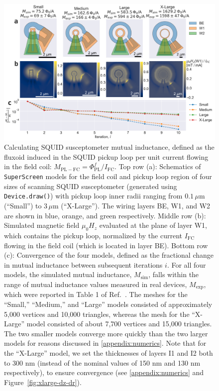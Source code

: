 \documentclass[final,3p,times,twocolumn]{elsarticle}
\newcommand{\inline}[1]{\texttt{#1}\xspace}
\newcommand{\SuperScreen}{\inline{SuperScreen}}
\newcommand{\um}{\mu\mathrm{m}}
\begin{document}
\begin{figure}[t]
    \centering
    \includegraphics[width=\textwidth]{examples/images/squid-mutuals.pdf}
    \caption{Calculating SQUID susceptometer mutual inductance, defined as the fluxoid induced in the SQUID pickup loop per unit current flowing in the field coil: $M_\mathrm{PL-FC}=\Phi^f_\mathrm{PL} / I_\mathrm{FC}$. Top row (a): Schematics of \SuperScreen models for the field coil and pickup loop region of four sizes of scanning SQUID susceptometer (generated using \inline{Device.draw()}) with pickup loop inner radii ranging from $0.1\,\um$ (``Small'') to $3\,\um$ (``X-Large''). The wiring layers BE, W1, and W2 are shown in blue, orange, and green respectively. Middle row (b): Simulated magnetic field $\mu_0H_z$ evaluated at the plane of layer W1, which contains the pickup loop, normalized by the current $I_\mathrm{FC}$ flowing in the field coil (which is located in layer BE). Bottom row (c): Convergence of the four models, defined as the fractional change in mutual inductance between subsequent iterations $i$. For all four models, the simulated mutual inductance, $M_\mathrm{sim}$, falls within the range of mutual inductance values measured in real devices, $M_\mathrm{exp}$, which were reported in Table 1 of Ref.~\cite{Kirtley2016-zz}. The meshes for the ``Small,'' ``Medium,'' and ``Large'' models consisted of approximately 5,000 vertices and 10,000 triangles, whereas the mesh for the ``X-Large'' model consisted of about 7,700 vertices and 15,000 triangles. The two smaller models converge more quickly than the two larger models for reasons discussed in \ref{appendix:numerics}. Note that for the ``X-Large'' model, we set the thicknesses of layers I1 and I2 both to 300 nm (instead of the nominal values of 150 nm and 130 nm respectively), to ensure convergence (see \ref{appendix:numerics} and Figure~\ref{fig:xlarge-dz-dr}).}
    \label{fig:squid-mutuals}
\end{figure}
\end{document}
